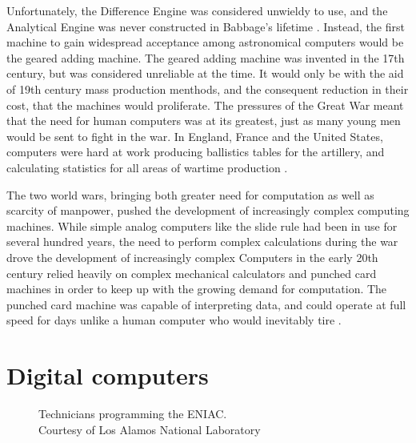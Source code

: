 \documentclass[\rootfolder/main.tex]{subfiles}
\begin{document}
Unfortunately, the Difference Engine was considered unwieldy to use, and the Analytical Engine was never constructed in Babbage's lifetime \cite{babbage1832}.
Instead, the first machine to gain widespread acceptance among astronomical computers would be the geared adding machine.
The geared adding machine was invented in the 17th century, but was considered unreliable at the time.
It would only be with the aid of 19th century mass production menthods, and the consequent reduction in their cost, that the machines would proliferate.
The pressures of the Great War meant that the need for human computers was at its greatest, just as many young men would be sent to fight in the war.
In England, France and the United States, computers were hard at work producing ballistics tables for the artillery, and calculating statistics for all areas of wartime production \cite{grier1955}.

The two world wars, bringing both greater need for computation as well as scarcity of manpower, pushed the development of increasingly complex computing machines.
While simple analog computers like the slide rule had been in use for several hundred years, the need to perform complex calculations during the war drove the development of increasingly complex
Computers in the early 20th century relied heavily on complex mechanical calculators and punched card machines in order to keep up with the growing demand for computation.
The punched card machine was capable of interpreting data, and could operate at full speed for days unlike a human computer who would inevitably tire \cite{carr}.

\section{Digital computers}

\begin{wrapfigure}{R}{0.6\columnwidth}
    \caption[Technicians programming the ENIAC]
            {Technicians programming the ENIAC. \\ Courtesy of Los Alamos National Laboratory\label{fig:eniac}}
\end{wrapfigure}
\end{document}
